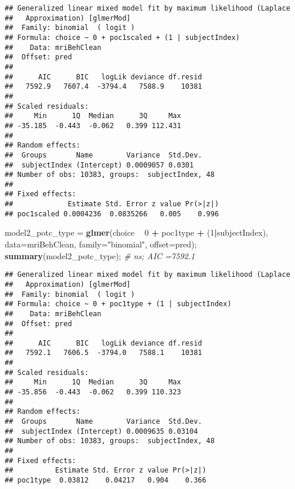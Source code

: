 \documentclass[]{article}
\newenvironment{Shaded}{\begin{snugshade}}{\end{snugshade}}
\newcommand{\CommentTok}[1]{\textcolor[rgb]{0.56,0.35,0.01}{\textit{#1}}}
\newcommand{\DataTypeTok}[1]{\textcolor[rgb]{0.13,0.29,0.53}{#1}}
\newcommand{\DecValTok}[1]{\textcolor[rgb]{0.00,0.00,0.81}{#1}}
\newcommand{\KeywordTok}[1]{\textcolor[rgb]{0.13,0.29,0.53}{\textbf{#1}}}
\newcommand{\NormalTok}[1]{#1}
\newcommand{\OperatorTok}[1]{\textcolor[rgb]{0.81,0.36,0.00}{\textbf{#1}}}
\newcommand{\StringTok}[1]{\textcolor[rgb]{0.31,0.60,0.02}{#1}}
\begin{document}
\begin{verbatim}
## Generalized linear mixed model fit by maximum likelihood (Laplace
##   Approximation) [glmerMod]
##  Family: binomial  ( logit )
## Formula: choice ~ 0 + poc1scaled + (1 | subjectIndex)
##    Data: mriBehClean
##  Offset: pred
## 
##      AIC      BIC   logLik deviance df.resid 
##   7592.9   7607.4  -3794.4   7588.9    10381 
## 
## Scaled residuals: 
##     Min      1Q  Median      3Q     Max 
## -35.185  -0.443  -0.062   0.399 112.431 
## 
## Random effects:
##  Groups       Name        Variance  Std.Dev.
##  subjectIndex (Intercept) 0.0009057 0.0301  
## Number of obs: 10383, groups:  subjectIndex, 48
## 
## Fixed effects:
##             Estimate Std. Error z value Pr(>|z|)
## poc1scaled 0.0004236  0.0835266   0.005    0.996
\end{verbatim}

\begin{Shaded}
\begin{Highlighting}[]
\NormalTok{model2_potc_type =}\StringTok{ }\KeywordTok{glmer}\NormalTok{(choice }\OperatorTok{~}\StringTok{ }\DecValTok{0} \OperatorTok{+}\StringTok{ }\NormalTok{poc1type }\OperatorTok{+}\StringTok{ }\NormalTok{(}\DecValTok{1}\OperatorTok{|}\NormalTok{subjectIndex), }\DataTypeTok{data=}\NormalTok{mriBehClean, }\DataTypeTok{family=}\StringTok{"binomial"}\NormalTok{, }\DataTypeTok{offset=}\NormalTok{pred);}
\KeywordTok{summary}\NormalTok{(model2_potc_type); }\CommentTok{# ns; AIC =7592.1 }
\end{Highlighting}
\end{Shaded}

\begin{verbatim}
## Generalized linear mixed model fit by maximum likelihood (Laplace
##   Approximation) [glmerMod]
##  Family: binomial  ( logit )
## Formula: choice ~ 0 + poc1type + (1 | subjectIndex)
##    Data: mriBehClean
##  Offset: pred
## 
##      AIC      BIC   logLik deviance df.resid 
##   7592.1   7606.5  -3794.0   7588.1    10381 
## 
## Scaled residuals: 
##     Min      1Q  Median      3Q     Max 
## -35.856  -0.443  -0.062   0.399 110.323 
## 
## Random effects:
##  Groups       Name        Variance  Std.Dev.
##  subjectIndex (Intercept) 0.0009635 0.03104 
## Number of obs: 10383, groups:  subjectIndex, 48
## 
## Fixed effects:
##          Estimate Std. Error z value Pr(>|z|)
## poc1type  0.03812    0.04217   0.904    0.366
\end{verbatim}
\end{document}
